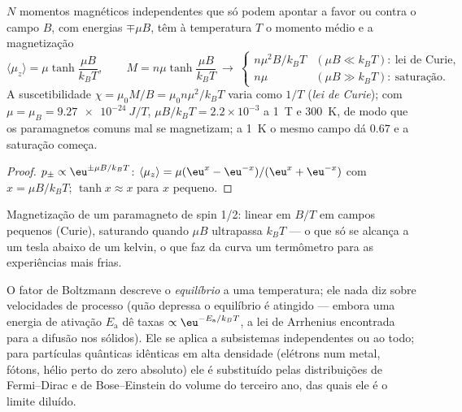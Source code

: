 \begin{proposition}\label{prop:b2:boltzmann-factor:curie}
$N$ momentos magnéticos independentes que só podem apontar a favor ou contra
o campo $B$, com energias $\mp\mu B$, têm à temperatura $T$ o momento
médio e a magnetização
\[
\langle\mu_z\rangle = \mu\tanh\frac{\mu B}{k_BT}, \qquad
M = n\mu\tanh\frac{\mu B}{k_BT}
\ \longrightarrow\
\begin{cases} n\mu^2B/k_BT & (\mu B \ll k_BT):\ \text{lei de Curie}, \\ n\mu & (\mu B \gg k_BT):\ \text{saturação}. \end{cases}
\]
A suscetibilidade $\chi = \mu_0M/B = \mu_0n\mu^2/k_BT$ varia como $1/T$
(\emph{lei de Curie}\index{lei de Curie}); com $\mu = \mu_B = \qty{9.27e-24}{J/T}$,
$\mu B/k_BT = 2.2 \times 10^{-3}$ a \qty{1}{T} e \qty{300}{K}, de modo que os paramagnetos
comuns mal se magnetizam; a \qty{1}{K} o mesmo campo dá
$0.67$ e a saturação começa.
\end{proposition}

\begin{proof}
$p_\pm \propto\eu^{\pm\mu B/k_BT}$: $\langle\mu_z\rangle = \mu(\eu^x - \eu^{-x})/(\eu^x +
\eu^{-x})$ com $x = \mu B/k_BT$; $\tanh x \approx x$ para $x$ pequeno.
\end{proof}

\begin{omfigure}

{\small Magnetização de um paramagneto de spin 1/2: linear em $B/T$ em
campos pequenos (Curie), saturando quando $\mu B$ ultrapassa $k_BT$ --- o que só
se alcança a um tesla abaixo de um kelvin, o que faz da curva um termômetro
para as experiências mais frias.}
\end{omfigure}

\begin{remark}\label{rem:b2:boltzmann-factor:limits}
O fator de Boltzmann descreve o \emph{equilíbrio} a uma temperatura; ele
nada diz sobre velocidades de processo (quão depressa o equilíbrio é atingido --- embora
uma energia de ativação $E_{\text{a}}$ dê taxas $\propto\eu^{-E_{\text{a}}/k_BT}$,
a lei de Arrhenius encontrada para a difusão nos sólidos). Ele se aplica a
subsistemas independentes ou ao todo; para partículas quânticas
idênticas em alta densidade (elétrons num metal, fótons, hélio perto do
zero absoluto) ele é substituído pelas distribuições de Fermi--Dirac e de Bose--Einstein
do volume do terceiro ano, das quais ele é o limite diluído.
\end{remark}

